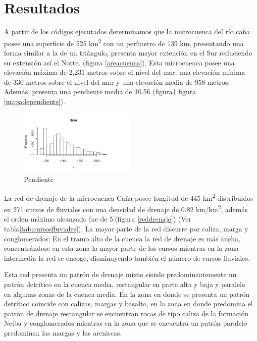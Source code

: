 \documentclass[11pt,]{article}
\begin{document}
\section{Resultados}\label{resultados}

A partir de los códigos ejecutados determinamos que la microcuenca del
río caña posee una superficie de 525 km\textsuperscript{2} con un
perímetro de 139 km, presentando una forma similar a la de un triángulo,
presenta mayor extensión en el Sur reduciendo su extensión así el Norte.
(figura \ref{areacuenca}). Esta microcuenca posee una elevación máxima
de 2,231 metros sobre el nivel del mar, una elevación mínima de 330
metros sobre el nivel del mar y una elevación media de 958 metros.
Además, presenta una pendiente media de 10.56 (figura\ref{pendiente}
figura \ref{mapadependiente}).

\begin{figure}
\centering
\includegraphics[width=0.50000\textwidth]{pendiente_cana.png}
\caption{Pendiente\label{pendiente}}
\end{figure}

La red de drenaje de la microcuenca Caña posee longitud de 445
km\textsuperscript{2} distribuidos en 271 cursos de fluviales con una
densidad de drenaje de 0.82 km/km\textsuperscript{2}, además el orden
máximo alcanzado fue de 5.(figura \ref{reddrenaje}) (Ver
tabla\ref{tab:cursosfluviales}). La mayor parte de la red discurre por
caliza, marga y conglomerados; En el tramo alto de la cuenca la red de
drenaje es más ancha, concentrándose en esta zona la mayor parte de los
cursos mientras en la zona intermedia la red se encoge, disminuyendo
también el número de cursos fluviales.

Esta red presenta un patrón de drenaje mixto siendo predominantemente un
patrón detrítico en la cuenca media, rectangular en parte alta y baja y
paralelo en algunas zonas de la cuenca media. En la zona en donde se
presenta un patrón detrítico coincide con calizas, margas y basalto, en
la zona en donde predomina el patrón de drenaje rectangular se
encuentran rocas de tipo caliza de la formación Neiba y conglomerados
mientras en la zona que se encuentra un patrón paralelo predominan las
margas y las areniscas.
\end{document}
